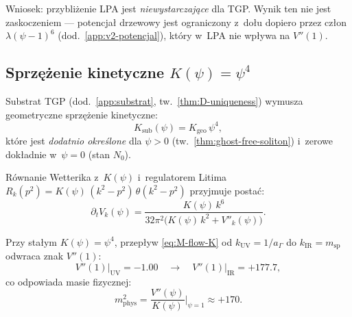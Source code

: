 Wniosek: przybli\.zenie LPA jest \emph{niewystarczaj\k{a}ce} dla TGP.
Wynik ten nie jest zaskoczeniem --- potencja\l{} drzewowy
jest ograniczony z~do\l{}u dopiero przez cz\l{}on
$\lambda(\psi-1)^6$ (dod.~\ref{app:v2-potencjal}),
kt\'ory w~LPA nie wp\l{}ywa na $V''(1)$.

\subsection{Sprz\k{e}\.zenie kinetyczne $K(\psi) = \psi^4$}
\label{ssec:M-Kpsi4}

Substrat TGP (dod.~\ref{app:substrat}, tw.~\ref{thm:D-uniqueness})
wymusza geometryczne sprz\k{e}\.zenie kinetyczne:
\begin{equation}\label{eq:M-Ksub}
    K_{\mathrm{sub}}(\psi) = K_{\mathrm{geo}}\,\psi^4,
\end{equation}
kt\'ore jest \emph{dodatnio okre\'slone} dla $\psi > 0$
(tw.~\ref{thm:ghost-free-soliton}) i~zerowe dok\l{}adnie
w~$\psi = 0$ (stan $N_0$).

R\'ownanie Wetterika z~$K(\psi)$ i~regulatorem Litima
$R_k(p^2) = K(\psi)\,(k^2 - p^2)\,\theta(k^2 - p^2)$
przyjmuje posta\'c:
\begin{equation}\label{eq:M-flow-K}
    \boxed{
    \partial_t V_k(\psi)
    = \frac{K(\psi)\,k^6}
           {32\pi^2\bigl(K(\psi)\,k^2 + V''_k(\psi)\bigr)}.
    }
\end{equation}

\begin{theorem}[Stabilizacja pr\'o\.zni przez $K(\psi)=\psi^4$]%
\label{thm:M-vacuum-stable}
Przy sta\l{}ym $K(\psi) = \psi^4$, przep\l{}yw \eqref{eq:M-flow-K}
od $k_{\mathrm{UV}} = 1/a_\Gamma$ do $k_{\mathrm{IR}} = m_{\mathrm{sp}}$
odwraca znak $V''(1)$:
\begin{equation}\label{eq:M-Vpp-flip}
    V''(1)\big|_{\mathrm{UV}} = -1.00
    \quad\longrightarrow\quad
    V''(1)\big|_{\mathrm{IR}} = +177.7,
\end{equation}
co odpowiada masie fizycznej:
\begin{equation}
    m^2_{\mathrm{phys}} = \frac{V''(\psi)}{K(\psi)}\bigg|_{\psi=1}
    \approx +170.
\end{equation}
\end{theorem}

